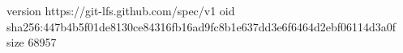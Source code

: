 version https://git-lfs.github.com/spec/v1
oid sha256:447b4b5f01de8130ce84316fb16ad9fc8b1e637dd3e6f6464d2ebf06114d3a0f
size 68957
